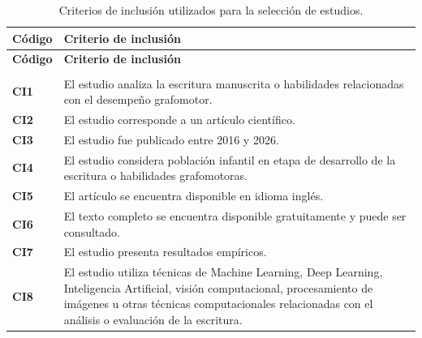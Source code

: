 \documentclass{iaesarticle}
\begin{document}
\begin{longtable}{%
    |>{\centering\arraybackslash}p{}%
    |>{\raggedright\arraybackslash}p{}|}
\caption{Criterios de inclusión utilizados para la selección de estudios.}
\label{tab:criterios-inclusion}\\
\hline
\rowcolor{blue!10}
\textbf{Código} & \textbf{Criterio de inclusión} \\ 
\hline
\endfirsthead

\hline
\rowcolor{blue!10}
\textbf{Código} & \textbf{Criterio de inclusión} \\ 
\hline
\endhead

\hline
\multicolumn{2}{r}{Continúa en la siguiente página} \\
\endfoot

\hline
\endlastfoot

\scriptsize

\textbf{CI1} &
El estudio analiza la escritura manuscrita o habilidades relacionadas con el desempeño grafomotor. \\ \hline

\textbf{CI2} &
El estudio corresponde a un artículo científico. \\ \hline

\textbf{CI3} &
El estudio fue publicado entre 2016 y 2026. \\ \hline

\textbf{CI4} &
El estudio considera población infantil en etapa de desarrollo de la escritura o habilidades grafomotoras. \\ \hline

\textbf{CI5} &
El artículo se encuentra disponible en idioma inglés. \\ \hline

\textbf{CI6} &
El texto completo se encuentra disponible gratuitamente y puede ser consultado. \\ \hline

\textbf{CI7} &
El estudio presenta resultados empíricos. \\ \hline

\textbf{CI8} &
El estudio utiliza técnicas de Machine Learning, Deep Learning, Inteligencia Artificial, visión computacional, procesamiento de imágenes u otras técnicas computacionales relacionadas con el análisis o evaluación de la escritura. \\ \hline

\end{longtable}

\vspace{0.5em}
\end{document}
